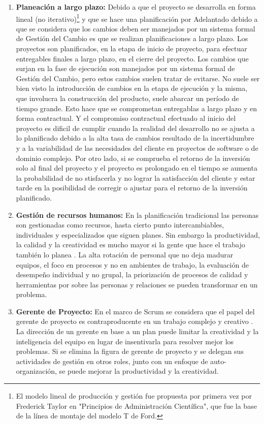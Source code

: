 \begin{enumerate}
\item \textbf{Planeación a largo plazo:} Debido a que el proyecto se desarrolla en forma lineal (no iterativo)\footnote{El modelo lineal de producción y gestión fue propuesta por primera vez por Frederick Taylor en "Principios de Administración Científica", que fue la base de la línea de montaje del modelo T de Ford.} y que se hace una planificación por Adelantado debido a que se considera que los cambios deben ser manejados por un sistema formal de Gestión del Cambio es que se realizan planificaciones a largo plazo. Los proyectos son planificados, en la etapa de inicio de proyecto, para efectuar entregables finales a largo plazo, en el cierre del proyecto. Los cambios que surjan en la fase de ejecución son manejados por un sistema formal de Gestión del Cambio, pero estos cambios suelen tratar de evitarse. No suele ser bien visto la introducción de cambios en la etapa de ejecución y la misma, que involucra la construcción del producto, suele abarcar un período de tiempo grande. Esto hace que se comprometan entregablas a largo plazo y en forma contractual. Y el compromiso contractual efectuado al inicio del proyecto es dificil de cumplir cuando la realidad del desarrollo no se ajusta a lo planificado debido a la alta tasa de cambios resultado de la incertidumbre y a la variabilidad de las necesidades del cliente en proyectos de software o de dominio complejo. Por otro lado, si se comprueba el retorno de la inversión solo al final del proyecto y el proyecto es prolongado en el tiempo se aumenta la probabilidad de no stisfacerla y no lograr la satisfacción del cliente y estar tarde en la posibilidad de corregir o ajustar para el retorno de la inversión planificado.

\item \textbf{Gestión de recursos humanos:} En la planificación tradicional las personas son gestionadas como recursos, hasta cierto punto intercambiables, individuales y especializados que siguen planes. Sin embargo la productividad, la calidad y la creatividad es mucho mayor si la gente que hace el trabajo también lo planea \cite{Ken-Schwaber-2011}. La alta rotación de personal que no deja madurar equipos, el foco en procesos y no en ambientes de trabajo, la evaluación de desempeño individual y no grupal, la priorización de procesos de calidad y herramientas por sobre las personas y relaciones se pueden transformar en un problema.

\item \textbf{Gerente de Proyecto:} En el marco de Scrum se considera que el papel del gerente de proyecto es contraproducente en un trabajo complejo y creativo \cite{Ken-Schwaber-2011}. La dirección de un gerente en base a un plan puede limitar la creatividad y la inteligencia del equipo en lugar de insentivarla para resolver mejor los problemas. Si se elimina la figura de gerente de proyecto y se delegan sus actividades de gestión en otros roles, junto con un enfoque de auto-organización, se puede mejorar la productividad y la creatividad.


\end{enumerate}
